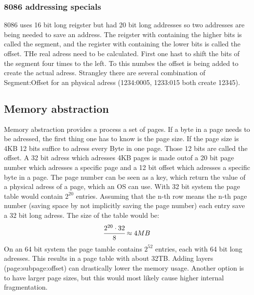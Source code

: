 \documentclass[a4paper]{scrartcl}
\begin{document}
                \subsubsection{8086 addressing specials}
                 8086 uses 16 bit long reigster but had 20 bit long addresses so two addresses are being needed to save an address. The reigster with containing the higher bits is called the segment, 
                 and the register with containing the lower bits is called the offset. THe real adress need to be calculated. First one hast to shift the bits of the segment four times to the left. To this numbes
                 the offset is being added to create the actual adress. Strangley there are several combination of Segment:Offset for an physical adress (1234:0005, 1233:015 both create 12345).
            \subsection{Memory abstraction}
                Memory abstraction provides a process a set of pages. If a byte in a page needs to be adressed, the first thing one has to know is the page size. If the page size is 4KB
                12 bits suffice to adress every Byte in one page.  Those 12 bits are called the offset. A 32 bit adress which adresses 4KB pages is made outof a 20 bit page number which
                adresses a specific page and a 12 bit offset which adresses a specific byte in a page. The page number can be seen as a key, which return the value of a physical adress
                of a page, which an OS can use. With 32 bit system the page table would contain \(2^20\) entries. Assuming that the n-th row means the n-th page number (saving space by not implicitly saving
                the page number) each entry save a 32 bit long adress. The size of the table would be:
                \begin{equation*}
                    \cfrac{2^{20} \cdot 32}{8} \approx 4MB
                \end{equation*} 
                On an 64 bit system the page tamble contains \(2^{52}\) entries, each with 64 bit long adresses. This results in a page table with about 32TB. Adding layers (page:subpage:offset)
                can drastically lower the memory usage. Another option is to have larger page sizes, but this would most likely cause higher internal fragmentation.
\end{document}
